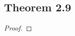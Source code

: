\documentclass[../../main.tex]{subfiles}
\begin{document}
\subsection{Theorem 2.9}
\begin{wts}

\end{wts}
\begin{proof}

\end{proof}
\end{document}
